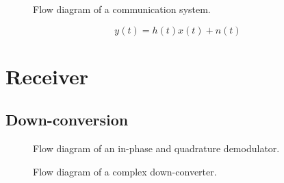 \begin{figure}[htb]
	\centering
	
	\caption{Flow diagram of a communication system.}
\end{figure}
\begin{equation}
	y(t)
	=
	h(t)x(t)
	+
	n(t)
\end{equation}

\section{Receiver}


\subsection{Down-conversion}

\begin{figure}[htb]
	\centering
	
	\caption{Flow diagram of an in-phase and quadrature demodulator.}
\end{figure}
\begin{figure}[htb]
	\centering
	
	\caption{Flow diagram of a complex down-converter.}
\end{figure}